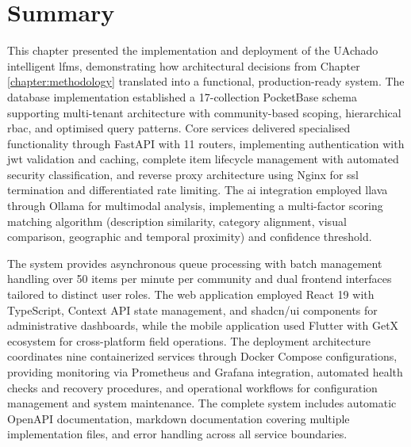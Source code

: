 \section{Summary} \label{section:implementation_summary}

This chapter presented the implementation and deployment of the UAchado intelligent \ac{lfms}, demonstrating how architectural decisions from Chapter \ref{chapter:methodology} translated into a functional, production-ready system. The database implementation established a 17-collection PocketBase schema supporting multi-tenant architecture with community-based scoping, hierarchical \ac{rbac}, and optimised query patterns. Core services delivered specialised functionality through FastAPI with 11 routers, implementing authentication with \ac{jwt} validation and caching, complete item lifecycle management with automated security classification, and reverse proxy architecture using Nginx for \ac{ssl} termination and differentiated rate limiting. The \ac{ai} integration employed \ac{llava} through Ollama for multimodal analysis, implementing a multi-factor scoring matching algorithm (description similarity, category alignment, visual comparison, geographic and temporal proximity) and confidence threshold.

The system provides asynchronous queue processing with batch management handling over 50 items per minute per community and dual frontend interfaces tailored to distinct user roles. The web application employed React 19 with TypeScript, Context API state management, and shadcn/ui components for administrative dashboards, while the mobile application used Flutter with GetX ecosystem for cross-platform field operations. The deployment architecture coordinates nine containerized services through Docker Compose configurations, providing monitoring via Prometheus and Grafana integration, automated health checks and recovery procedures, and operational workflows for configuration management and system maintenance. The complete system includes automatic OpenAPI documentation, markdown documentation covering multiple implementation files, and error handling across all service boundaries.